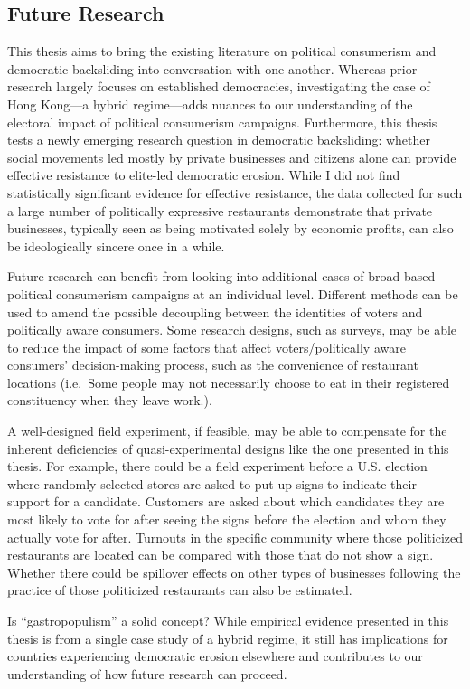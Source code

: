 \documentclass[letterpaper, 12pt]{article}
\begin{document}
\subsection{Future Research}
This thesis aims to bring the existing literature on political consumerism and democratic backsliding into conversation with one another. Whereas prior research largely focuses on established democracies, investigating the case of Hong Kong---a hybrid regime---adds nuances to our understanding of the electoral impact of political consumerism campaigns. Furthermore, this thesis tests a newly emerging research question in democratic backsliding: whether social movements led mostly by private businesses and citizens alone can provide effective resistance to elite-led democratic erosion. While I did not find statistically significant evidence for effective resistance, the data collected for such a large number of politically expressive restaurants demonstrate that private businesses, typically seen as being motivated solely by economic profits, can also be ideologically sincere once in a while. 

Future research can benefit from looking into additional cases of broad-based political consumerism campaigns at an individual level. Different methods can be used to amend the possible decoupling between the identities of voters and politically aware consumers. Some research designs, such as surveys, may be able to reduce the impact of some factors that affect voters/politically aware consumers' decision-making process, such as the convenience of restaurant locations (i.e.\ Some people may not necessarily choose to eat in their registered constituency when they leave work.). 

A well-designed field experiment, if feasible, may be able to compensate for the inherent deficiencies of quasi-experimental designs like the one presented in this thesis. For example, there could be a field experiment before a U.S. election where randomly selected stores are asked to put up signs to indicate their support for a candidate. Customers are asked about which candidates they are most likely to vote for after seeing the signs before the election and whom they actually vote for after. Turnouts in the specific community where those politicized restaurants are located can be compared with those that do not show a sign. Whether there could be spillover effects on other types of businesses following the practice of those politicized restaurants can also be estimated. 

Is ``gastropopulism'' a solid concept? While empirical evidence presented in this thesis is from a single case study of a hybrid regime, it still has implications for countries experiencing democratic erosion elsewhere and contributes to our understanding of how future research can proceed. 
\end{document}

